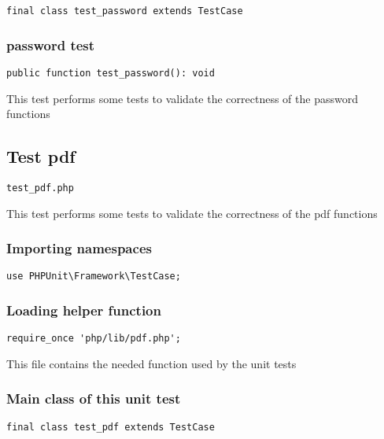 \documentclass[a4paper]{article}
\begin{document}
\begin{lstlisting}
final class test_password extends TestCase
\end{lstlisting}

\hypertarget{toc289}{}
\subsubsection{password test}

\begin{lstlisting}
public function test_password(): void
\end{lstlisting}

This test performs some tests to validate the correctness
of the password functions

\hypertarget{toc290}{}
\subsection{Test pdf}

\begin{lstlisting}
test_pdf.php
\end{lstlisting}

This test performs some tests to validate the correctness
of the pdf functions

\hypertarget{toc291}{}
\subsubsection{Importing namespaces}

\begin{lstlisting}
use PHPUnit\Framework\TestCase;
\end{lstlisting}

\hypertarget{toc292}{}
\subsubsection{Loading helper function}

\begin{lstlisting}
require_once 'php/lib/pdf.php';
\end{lstlisting}

This file contains the needed function used by the unit tests

\hypertarget{toc293}{}
\subsubsection{Main class of this unit test}

\begin{lstlisting}
final class test_pdf extends TestCase
\end{lstlisting}
\end{document}
